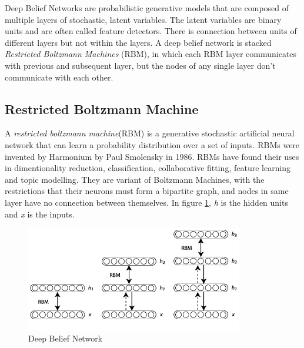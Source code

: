 \documentclass[12pt, a4paper]{report}
\begin{document}
Deep Belief Networks are probabilistic generative models that are composed of multiple layers of stochastic, latent variables. The latent variables are binary units and are often called feature detectors\cite{DBN}. There is connection between units of different layers but not within the layers.
A deep belief network is stacked \textit{Restricted Boltzmann Machines} (RBM), in which each RBM layer communicates with previous and subsequent layer, but the nodes of any single layer don't communicate with each other.

\subsection{Restricted Boltzmann Machine}\label{sec:RBM}

A \textit{restricted boltzmann machine}(RBM) is a generative stochastic artificial neural network that can learn a probability distribution over a set of inputs. RBMs were invented by Harmonium by Paul Smolensky in 1986\cite{RBM}. RBMs have found their uses in dimentionality reduction, classification, collaborative fitting, feature learning and topic modelling\cite{RBMuses}. They are variant of Boltzmann Machines, with the restrictions that their neurons must form a bipartite graph, and nodes in same layer have no connection between themselves. In figure \ref{fig:RBM}, \textit{h} is the hidden units and \textit{x} is the inputs.\\ \par

\begin{figure}[h]
\centering
\includegraphics[width=9.5cm]{DBN.png}
\caption{Deep Belief Network}
\label{fig:RBM}
\end{figure}
\end{document}

